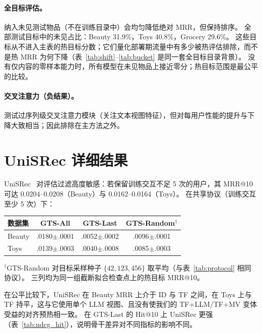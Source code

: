 \documentclass[sigconf,natbib=true,anonymous]{acmart}
\newcommand{\tfllm}{\textsc{TF+LLM}\xspace}
\newcommand{\tfmv}{\textsc{TF+MV}\xspace}
\begin{document}
\paragraph{全目标评估。}
纳入未见测试物品（不在训练目录中）会均匀降低绝对 MRR，但保持排序。
全部测试目标中的未见占比：Beauty 31.9\%，Toys 40.8\%，Grocery 29.6\%。
这些目标从不进入主表的热目标分数；它们量化部署期流量中有多少被热评估排除，而不是热 MRR 为何下降（表~\ref{tab:shift}--\ref{tab:bucket} 是同一套全目标目录背景）。
没有仅内容的零样本能力时，所有模型在未见物品上接近零分；热目标范围是最公平的比较。

\paragraph{交叉注意力（负结果）。}
\label{app:cross}
测试过序列级交叉注意力模块（关注文本视图特征），但对每用户性能的提升与下降大致相当；因此排除在主方法之外。

\section{UniSRec 详细结果}
\label{app:unisrec}

UniSRec~\cite{hou2022unisrec} 对评估过滤高度敏感：若保留训练交互不足 5 次的用户，其 MRR@10 可达 0.0204--0.0208（Beauty）与 0.0162--0.0164（Toys）。
在共享协议（训练交互至少 5 次）下：

\begin{table}[h]
\centering
\small
\begin{tabular}{@{}lccc@{}}
\toprule
数据集 & GTS-All & GTS-Last & GTS-Random$^\dagger$ \\
\midrule
Beauty & .0180$\pm$.0001 & .0052$\pm$.0002 & .0096$\pm$.0001 \\
Toys   & .0139$\pm$.0003 & .0040$\pm$.0008 & .0085$\pm$.0003 \\
\bottomrule
\end{tabular}
\end{table}

\noindent$^\dagger$GTS-Random 对目标采样种子 $\{42,123,456\}$ 取平均（与表~\ref{tab:protocol} 相同协议）。
三列均为同一组截断拟合检查点上的热目标 MRR@10。

在公平比较下，UniSRec 在 Beauty MRR 上介于 ID 与 TF 之间，在 Toys 上与 TF 持平，这与它使用单个 LLM 视图、且没有使我们的 \tfllm/\tfmv 变体受益的对齐预热相一致。
在 GTS-Last 的 Hit@10 上 UniSRec 更强（表~\ref{tab:ndcg_hit}），说明骨干差异对不同指标的影响不同。



\end{document}
